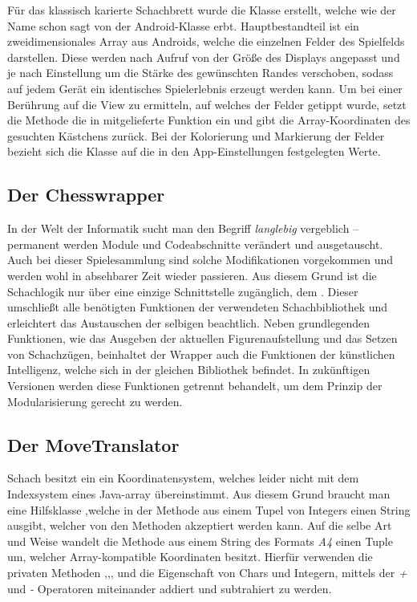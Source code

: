 Für das klassisch karierte Schachbrett wurde die Klasse
 erstellt, welche wie der Name schon sagt von der
Android-Klasse  erbt. Hauptbestandteil ist ein zweidimensionales
Array aus Androids, welche die einzelnen Felder des Spielfelds
darstellen. Diese werden nach Aufruf von  der Größe des
Displays angepasst und je nach Einstellung um die Stärke des gewünschten Randes
verschoben, sodass auf jedem Gerät ein identisches Spielerlebnis erzeugt werden
kann. Um bei einer Berührung auf die View zu ermitteln, auf welches der Felder
getippt wurde, setzt die Methode  die in
 mitgelieferte Funktion  ein und gibt
die Array-Koordinaten des gesuchten Kästchens zurück. Bei der Kolorierung und
Markierung der Felder bezieht sich die Klasse auf die in den App-Einstellungen
festgelegten Werte.

\subsection{Der Chesswrapper}

In der Welt der Informatik sucht man den Begriff \emph{langlebig} vergeblich --
permanent werden Module und Codeabschnitte verändert und ausgetauscht. Auch bei
dieser Spielesammlung sind solche Modifikationen vorgekommen und werden wohl in
absehbarer Zeit wieder passieren. Aus diesem Grund ist die Schachlogik nur über
eine einzige Schnittstelle zugänglich, dem . Dieser
umschließt alle benötigten Funktionen der verwendeten Schachbibliothek und
erleichtert das Austauschen der selbigen beachtlich. Neben grundlegenden
Funktionen, wie das Ausgeben der aktuellen Figurenaufstellung und das Setzen
von Schachzügen, beinhaltet der Wrapper auch die Funktionen der künstlichen
Intelligenz, welche sich in der gleichen Bibliothek befindet. In zukünftigen
Versionen werden diese Funktionen getrennt behandelt, um dem Prinzip der 
Modularisierung gerecht zu werden.

\subsection{Der MoveTranslator}
Schach besitzt ein ein Koordinatensystem, welches leider nicht mit dem 
Indexsystem eines Java-array übereinstimmt. Aus diesem Grund braucht man eine 
Hilfsklasse ,welche in der Methode  aus 
einem Tupel von Integers einen String ausgibt, welcher von den 
 Methoden akzeptiert werden kann. Auf die selbe Art und Weise 
wandelt die Methode  aus einem String des Formats \emph{A4} 
einen Tuple um, welcher Array-kompatible Koordinaten besitzt. Hierfür verwenden 
die privaten Methoden ,,, und 
 die Eigenschaft von Chars und Integern, mittels der \emph{+}
und \emph{-} Operatoren miteinander addiert und subtrahiert zu werden.


